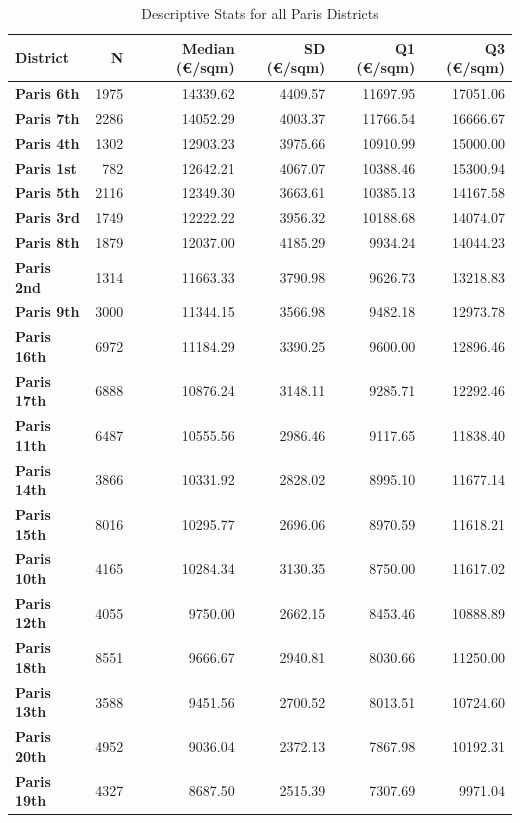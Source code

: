 \documentclass[12pt]{article}
\theoremstyle{plain}
\theoremstyle{remark}
\begin{document}
\begin{table}[!h]
    \centering
    \begin{tabular}{lrrrrr}
        \toprule
        \textbf{District} & \textbf{N} & \textbf{Median (€/sqm)} & \textbf{SD (€/sqm)} & \textbf{Q1 (€/sqm)} & \textbf{Q3 (€/sqm)} \\
        \midrule
        \rowcolor{gray!10}\textbf{Paris 6th} & 1975 & 14339.62 & 4409.57 & 11697.95 & 17051.06 \\
        \textbf{Paris 7th} & 2286 & 14052.29 & 4003.37 & 11766.54 & 16666.67 \\
        \midrule
        \rowcolor{gray!10}\textbf{Paris 4th} & 1302 & 12903.23 & 3975.66 & 10910.99 & 15000.00 \\
        \textbf{Paris 1st} & 782 & 12642.21 & 4067.07 & 10388.46 & 15300.94 \\
        \rowcolor{gray!10}\textbf{Paris 5th} & 2116 & 12349.30 & 3663.61 & 10385.13 & 14167.58 \\
        \textbf{Paris 3rd} & 1749 & 12222.22 & 3956.32 & 10188.68 & 14074.07 \\
        \midrule
        \rowcolor{gray!10}\textbf{Paris 8th} & 1879 & 12037.00 & 4185.29 & 9934.24 & 14044.23 \\
        \textbf{Paris 2nd} & 1314 & 11663.33 & 3790.98 & 9626.73 & 13218.83 \\
        \rowcolor{gray!10}\textbf{Paris 9th} & 3000 & 11344.15 & 3566.98 & 9482.18 & 12973.78 \\
        \textbf{Paris 16th} & 6972 & 11184.29 & 3390.25 & 9600.00 & 12896.46 \\
        \midrule
        \textbf{Paris 17th} & 6888 & 10876.24 & 3148.11 & 9285.71 & 12292.46 \\
        \rowcolor{gray!10}\textbf{Paris 11th} & 6487 & 10555.56 & 2986.46 & 9117.65 & 11838.40 \\
        \textbf{Paris 14th} & 3866 & 10331.92 & 2828.02 & 8995.10 & 11677.14 \\
        \rowcolor{gray!10}\textbf{Paris 15th} & 8016 & 10295.77 & 2696.06 & 8970.59 & 11618.21 \\
        \textbf{Paris 10th} & 4165 & 10284.34 & 3130.35 & 8750.00 & 11617.02 \\
        \midrule
        \rowcolor{gray!10}\textbf{Paris 12th} & 4055 & 9750.00 & 2662.15 & 8453.46 & 10888.89 \\
        \textbf{Paris 18th} & 8551 & 9666.67 & 2940.81 & 8030.66 & 11250.00 \\
        \rowcolor{gray!10}\textbf{Paris 13th} & 3588 & 9451.56 & 2700.52 & 8013.51 & 10724.60 \\
        \midrule
        \textbf{Paris 20th} & 4952 & 9036.04 & 2372.13 & 7867.98 & 10192.31 \\
        \rowcolor{gray!10}\textbf{Paris 19th} & 4327 & 8687.50 & 2515.39 & 7307.69 & 9971.04 \\
        \bottomrule
    \end{tabular}
    \caption{Descriptive Stats for all Paris Districts}
    \label{tab:stat_desc_Arrnd}

\end{table}
\end{document}
